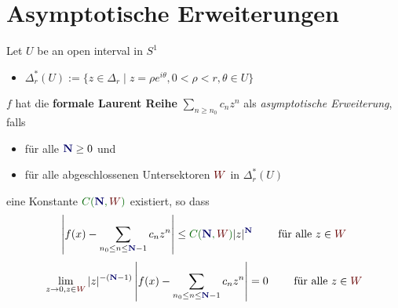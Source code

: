 \section{Asymptotische Erweiterungen} %
Let \textcolor{red!60!black}{$U$} be an open interval in $S^1$
\begin{defn}
  \begin{itemize}
    \item $\Delta_r^*(U):=
      \{z\in\Delta_r\mid z=\rho e^{i\theta},0<\rho<r,\theta\in U\}$%
      \begin{center}
      \end{center}
  \end{itemize}
\end{defn}
\begin{defn}
  \def\myN{\textbf{\textcolor{blue!40!black}{N}}}
  \def\mySect{\textcolor{red!40!black}{W}}
  \def\myConst{\textcolor{green!40!black}{C(\myN,\mySect)}}
  $f$ hat die \textbf{formale Laurent Reihe} $\sum_{n\geq n_0}c_nz^n$ als
  \emph{asymptotische Erweiterung}, falls
  \begin{itemize}
    \item für alle $\myN\geq0$ und
    \item für alle abgeschlossenen Untersektoren $\mySect$ in $\Delta_r^*(U)$
  \end{itemize}
  eine Konstante $\myConst$ existiert, so dass
  \[
    \left|
      f(x)-\sum_{n_0\leq n\leq \myN-1}c_nz^n
    \right|
    \leq \myConst|z|^{\myN} \qquad \text{ für alle } z\in \mySect
  \]
  \Leftrightarrow{}
  \[
    \lim_{z\to0,z\in{\mySect}}
    |z|^{-(\myN-1)}
    \left|
      f(x)-\sum_{n_0\leq n\leq \myN-1}c_nz^n
    \right|=0
    \qquad \text{ für alle } z\in \mySect
  \]
\end{defn}
\begin{lem}
  \TODO
\end{lem}
\begin{thm}
  \TODO
\end{thm}
